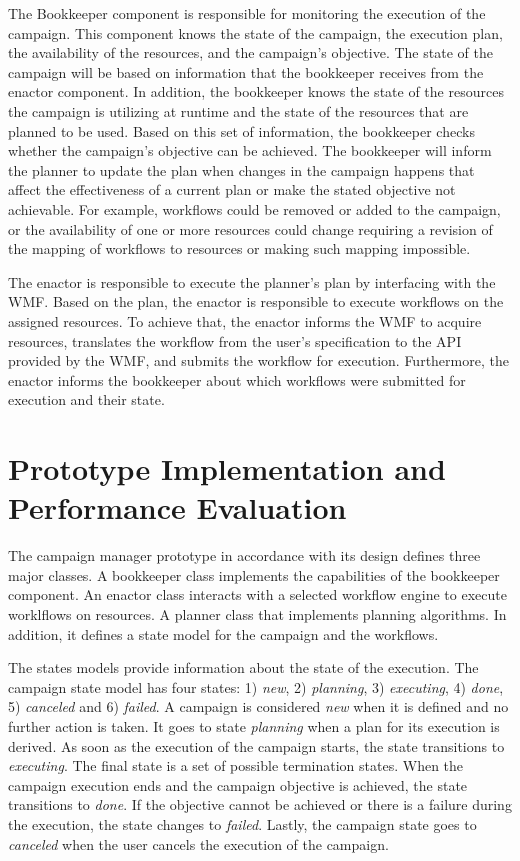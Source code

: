 The Bookkeeper component is responsible for monitoring the execution of the campaign.
This component knows the state of the campaign, the execution plan, the availability of the resources, and the campaign's objective.
The state of the campaign will be based on information that the bookkeeper receives from the enactor component.
In addition, the bookkeeper knows the state of the resources the campaign is utilizing at runtime and the state of the resources that are planned to be used.
Based on this set of information, the bookkeeper checks whether the campaign's objective can be achieved.
The bookkeeper will inform the planner to update the plan when changes in the campaign happens that affect the effectiveness of a current plan or make the stated objective not achievable. 
For example, workflows could be removed or added to the campaign, or the availability of one or more resources could change requiring a revision of the mapping of workflows to resources or making such mapping impossible.

The enactor is responsible to execute the planner's plan by interfacing with the WMF.
Based on the plan, the enactor is responsible to execute workflows on the assigned resources.
To achieve that, the enactor informs the WMF to acquire resources, translates the workflow from the user's specification to the API provided by the WMF, and submits the workflow for execution.
Furthermore, the enactor informs the bookkeeper about which workflows were submitted for execution and their state.

\section{Prototype Implementation and Performance Evaluation}
\label{sec:cm_impl}

The campaign manager prototype in accordance with its design defines three major classes.
A bookkeeper class implements the capabilities of the bookkeeper component.
An enactor class interacts with a selected workflow engine to execute worklflows on resources.
A planner class that implements planning algorithms.
In addition, it defines a state model for the campaign and the workflows.

The states models provide information about the state of the execution.
The campaign state model has four states: 1) \textit{new}, 2) \textit{planning}, 3) \textit{executing}, 4) \textit{done}, 5) \textit{canceled} and 6) \textit{failed}.
A campaign is considered \textit{new} when it is defined and no further action is taken.
It goes to state \textit{planning} when a plan for its execution is derived.
As soon as the execution of the campaign starts, the state transitions to \textit{executing}.
The final state is a set of possible termination states.
When the campaign execution ends and the campaign objective is achieved, the state transitions to \textit{done}.
If the objective cannot be achieved or there is a failure during the execution, the state changes to \textit{failed}.
Lastly, the campaign state goes to \textit{canceled} when the user cancels the execution of the campaign.

